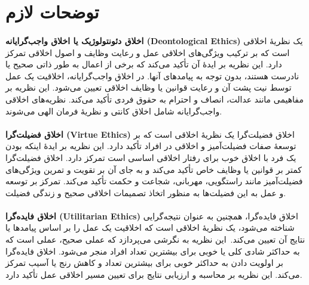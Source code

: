 
\section*{توضحات لازم}
\label{sec:توضحات لازم}

\paragraph{}
\textbf{اخلاق دئونتولوژیک یا اخلاق واجب‌گرایانه \textenglish{\textbf{(Deontological Ethics)}}}
یک نظریهٔ اخلاقی است که بر ترکیب ویژگی‌های اخلاقی عمل و رعایت وظایف و اصول اخلاقی تمرکز دارد.
این نظریه بر ایدهٔ آن تأکید می‌کند که برخی از اعمال به طور ذاتی صحیح یا نادرست هستند، بدون توجه به پیامدهای آنها.
در اخلاق واجب‌گرایانه، اخلاقیت یک عمل توسط نیت پشت آن و رعایت قوانین یا وظایف اخلاقی تعیین می‌شود.
این نظریه بر مفاهیمی مانند عدالت، انصاف و احترام به حقوق فردی تأکید می‌کند.
نظریه‌های اخلاقی واجب‌گرایانه شامل اخلاق کانتی و نظریهٔ فرمان الهی می‌شوند.

\paragraph{}
\textbf{اخلاق فضیلت‌گرا \textenglish{\textbf{(Virtue Ethics)}}}
اخلاق فضیلت‌گرا یک نظریهٔ اخلاقی است که بر توسعهٔ صفات فضیلت‌آمیز و اخلاقی در افراد تأکید دارد.
این نظریه بر ایدهٔ اینکه بودن یک فرد با اخلاق خوب برای رفتار اخلاقی اساسی است تمرکز دارد.
اخلاق فضیلت‌گرا کمتر بر قوانین یا وظایف خاص تأکید می‌کند و به جای آن بر تقویت و تمرین ویژگی‌های فضیلت‌آمیز مانند راستگویی، مهربانی، شجاعت و حکمت تأکید می‌کند.
تمرکز بر توسعه و عمل به این فضیلت‌ها به منظور اتخاذ تصمیمات اخلاقی صحیح و زندگی فضیلت.

\paragraph{}
\textbf{اخلاق فایده‌گرا \textenglish{\textbf{(Utilitarian Ethics)}}}
اخلاق فایده‌گرا، همچنین به عنوان نتیجه‌گرایی شناخته می‌شود، یک نظریهٔ اخلاقی است که اخلاقیت یک عمل را بر اساس پیامدها یا نتایج آن تعیین می‌کند.\     این نظریه به نگرشی می‌پردازد که عملی صحیح، عملی است که به حداکثر شادی کلی یا خوبی برای بیشترین تعداد افراد منجر می‌شود.
اخلاق فایده‌گرا بر اولویت دادن به حداکثر خوبی برای بیشترین تعداد و کاهش رنج یا آسیب تمرکز می‌کند.
این نظریه بر محاسبه و ارزیابی نتایج برای تعیین مسیر اخلاقی عمل تأکید دارد.


\newpage


